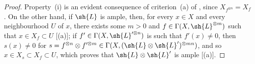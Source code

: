 \begin{proof}
  Property~(i) is an evident consequence of criterion~(a) of , since $X_{f^{\otimes n}}=X_f$.
  On the other hand, if $\sh{L}$ is ample, then, for every $x\in X$ and every neighbourhood $U$ of $x$, there exists some $m>0$ and $f\in\Gamma(X,\sh{L}^{\otimes m})$ such that $x\in X_f\subset U$ [(a)];
  if $f'\in\Gamma(X,\sh{L}'^{\otimes n})$ is such that $f'(x)\neq0$, then $s(x)\neq0$ for $s=f^{\otimes n}\otimes f'^{\otimes m}\in\Gamma(X,(\sh{L}\otimes\sh{L}')^{\otimes mn})$, and so $x\in X_s\subset X_f\subset U$, which proves that $\sh{L}\otimes\sh{L}'$ is ample [(a)].
\end{proof}


